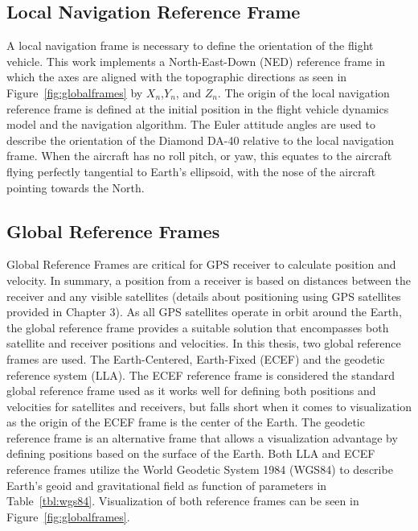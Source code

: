 \subsection{\textbf{Local Navigation Reference Frame}}
A local navigation frame is necessary to define the orientation of the flight vehicle. This work implements a North-East-Down (NED) reference frame in which the axes are aligned with the topographic directions as seen in Figure~\ref{fig:globalframes} by \(X_n\),\(Y_n\), and \(Z_n\). The origin of the local navigation reference frame is defined at the initial position in the flight vehicle dynamics model and the navigation algorithm. The Euler attitude angles are used to describe the orientation of the Diamond DA-40 relative to the local navigation frame. When the aircraft has no roll pitch, or yaw, this equates to the aircraft flying perfectly tangential to Earth's ellipsoid, with the nose of the aircraft pointing towards the North.

\subsection{\textbf{Global Reference Frames}}
Global Reference Frames are critical for GPS receiver to calculate position and velocity. In summary, a position from a receiver is based on distances between the receiver and any visible satellites (details about positioning using GPS satellites provided in Chapter 3). As all GPS satellites operate in orbit around the Earth, the global reference frame provides a suitable solution that encompasses both satellite and receiver positions and velocities. In this thesis, two global reference frames are used. The Earth-Centered, Earth-Fixed (ECEF) and the geodetic reference system (LLA). The ECEF reference frame is considered the standard global reference frame used as it works well for defining both positions and velocities for satellites and receivers, but falls short when it comes to visualization as the origin of the ECEF frame is the center of the Earth. The geodetic reference frame is an alternative frame that allows a visualization advantage by defining positions based on the surface of the Earth. Both LLA and ECEF reference frames utilize the World Geodetic System 1984 (WGS84) to describe Earth's geoid and gravitational field as function of parameters in Table~\ref{tbl:wgs84}. Visualization of both reference frames can be seen in Figure~\ref{fig:globalframes}.

